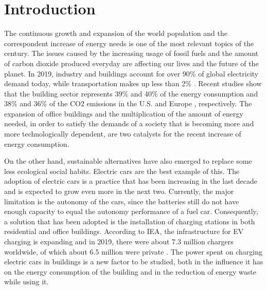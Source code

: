 \chapter{Introduction}
\label{chap:intro}

The continuous growth and expansion of the world population and the correspondent increase of energy needs is one of the most relevant topics of the century. The issues caused by the increasing usage of fossil fuels and the amount of carbon dioxide produced everyday are affecting our lives and the future of the planet. In 2019, industry and buildings account for over 90\% of global electricity demand today, while transportation makes up less than 2\% \cite{iea}. Recent studies show that the building sector represents 39\% and 40\% of the energy consumption and 38\% and 36\% of the CO2 emissions in the U.S. \cite{CivilUS} and Europe \cite{CivilEU}, respectively. The expansion of office buildings and the multiplication of the amount of energy needed, in order to satisfy the demands of a society that is becoming more and more technologically dependent, are two catalysts for the recent increase of energy consumption. 



On the other hand, sustainable alternatives have also emerged to replace some less ecological social habits. Electric cars are the best example of this. The adoption of electric cars is a practice that has been increasing in the last decade and is expected to grow even more in the next two. Currently, the major limitation is the autonomy of the cars, since the batteries still do not have enough capacity to equal the autonomy performance of a fuel car. Consequently, a solution that has been adopted is the installation of charging stations in both residential and office buildings. According to IEA, the infrastructure for \ac{EV} charging is expanding and in 2019, there were about 7.3 million chargers worldwide, of which about 6.5 million were private \cite{charger}. The power spent on charging electric cars in buildings is a new factor to be studied, both in the influence it has on the energy consumption of the building and in the reduction of energy waste while using it.


